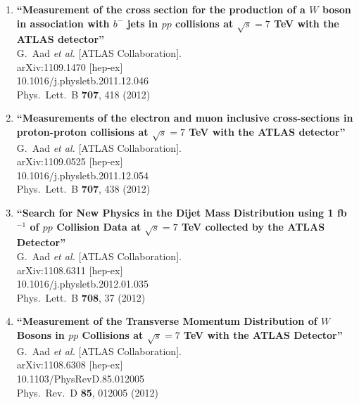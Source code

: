 \documentclass{article}
\begin{document}
\begin{enumerate}
\item%
{\bf ``Measurement of the cross section for the production of a $W$ boson in association with $b^-$ jets in $pp$ collisions at $\sqrt{s}=7$ TeV with the ATLAS detector''}
  \\{}G.~Aad {\it et al.}  [ATLAS Collaboration].
  \\{}arXiv:1109.1470 [hep-ex]
    \\{}10.1016/j.physletb.2011.12.046
\\{}Phys.\ Lett.\ B {\bf 707}, 418 (2012) %


\item%
{\bf ``Measurements of the electron and muon inclusive cross-sections in proton-proton collisions at $\sqrt{s}=7$ TeV with the ATLAS detector''}
  \\{}G.~Aad {\it et al.}  [ATLAS Collaboration].
  \\{}arXiv:1109.0525 [hep-ex]
    \\{}10.1016/j.physletb.2011.12.054
\\{}Phys.\ Lett.\ B {\bf 707}, 438 (2012) %


\item%
{\bf ``Search for New Physics in the Dijet Mass Distribution using 1 fb$^{-1}$ of $pp$ Collision Data at $\sqrt{s}=7$ TeV collected by the ATLAS Detector''}
  \\{}G.~Aad {\it et al.}  [ATLAS Collaboration].
  \\{}arXiv:1108.6311 [hep-ex]
    \\{}10.1016/j.physletb.2012.01.035
\\{}Phys.\ Lett.\ B {\bf 708}, 37 (2012) %


\item%
{\bf ``Measurement of the Transverse Momentum Distribution of $W$ Bosons in $pp$ Collisions at $\sqrt{s}=7$ TeV with the ATLAS Detector''}
  \\{}G.~Aad {\it et al.}  [ATLAS Collaboration].
  \\{}arXiv:1108.6308 [hep-ex]
    \\{}10.1103/PhysRevD.85.012005
\\{}Phys.\ Rev.\ D {\bf 85}, 012005 (2012) %



\end{enumerate}
\end{document}
